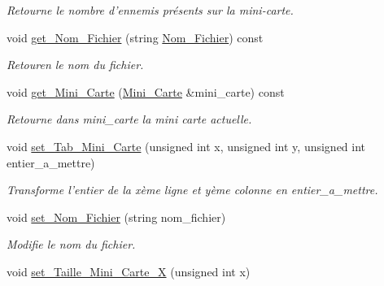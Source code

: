 \begin{DoxyCompactItemize}
\begin{DoxyCompactList}\small\item\em Retourne le nombre d'ennemis présents sur la mini-\/carte. \end{DoxyCompactList}\item 
\hypertarget{classMini__Carte_a4186d56afe409cb52e021a8ad6a6ca37}{void \hyperlink{classMini__Carte_a4186d56afe409cb52e021a8ad6a6ca37}{get\+\_\+\+Nom\+\_\+\+Fichier} (string \hyperlink{classMini__Carte_ad428c788dfb171b10f7a7f8153498475}{Nom\+\_\+\+Fichier}) const }\label{classMini__Carte_a4186d56afe409cb52e021a8ad6a6ca37}

\begin{DoxyCompactList}\small\item\em Retouren le nom du fichier. \end{DoxyCompactList}\item 
\hypertarget{classMini__Carte_a45e670383712f3a72ee735cd9e834a73}{void \hyperlink{classMini__Carte_a45e670383712f3a72ee735cd9e834a73}{get\+\_\+\+Mini\+\_\+\+Carte} (\hyperlink{classMini__Carte}{Mini\+\_\+\+Carte} \&mini\+\_\+carte) const }\label{classMini__Carte_a45e670383712f3a72ee735cd9e834a73}

\begin{DoxyCompactList}\small\item\em Retourne dans mini\+\_\+carte la mini carte actuelle. \end{DoxyCompactList}\item 
\hypertarget{classMini__Carte_adec3615384b8128e9281319b460ad7a2}{void \hyperlink{classMini__Carte_adec3615384b8128e9281319b460ad7a2}{set\+\_\+\+Tab\+\_\+\+Mini\+\_\+\+Carte} (unsigned int x, unsigned int y, unsigned int entier\+\_\+a\+\_\+mettre)}\label{classMini__Carte_adec3615384b8128e9281319b460ad7a2}

\begin{DoxyCompactList}\small\item\em Transforme l'entier de la xème ligne et yème colonne en entier\+\_\+a\+\_\+mettre. \end{DoxyCompactList}\item 
\hypertarget{classMini__Carte_a9d138ed93e2df25c4b7ef88d099c2665}{void \hyperlink{classMini__Carte_a9d138ed93e2df25c4b7ef88d099c2665}{set\+\_\+\+Nom\+\_\+\+Fichier} (string nom\+\_\+fichier)}\label{classMini__Carte_a9d138ed93e2df25c4b7ef88d099c2665}

\begin{DoxyCompactList}\small\item\em Modifie le nom du fichier. \end{DoxyCompactList}\item 
\hypertarget{classMini__Carte_a6341b67077c2ba0052d18da053cacca2}{void \hyperlink{classMini__Carte_a6341b67077c2ba0052d18da053cacca2}{set\+\_\+\+Taille\+\_\+\+Mini\+\_\+\+Carte\+\_\+\+X} (unsigned int x)}\label{classMini__Carte_a6341b67077c2ba0052d18da053cacca2}


\end{DoxyCompactItemize}
